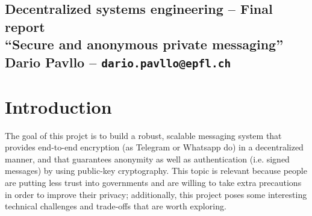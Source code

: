 \documentclass[a4paper,12pt]{article}
\title{}
\author{Dario Pavllo -- dario.pavllo@epfl.ch}
\date{} %
\begin{document}
{
\centering
\subsection*{Decentralized systems engineering -- Final report\\``Secure and anonymous private messaging''\\Dario Pavllo -- \texttt{dario.pavllo@epfl.ch}}}

\section{Introduction} %
The goal of this projct is to build a robust, scalable messaging system that provides end-to-end encryption (as Telegram or Whatsapp do) in a decentralized manner, and that guarantees anonymity as well as authentication (i.e. signed messages) by using public-key cryptography. This topic is relevant because people are putting less trust into governments and are willing to take extra precautions in order to improve their privacy; additionally, this project poses some interesting technical challenges and trade-offs that are worth exploring.
\end{document}
